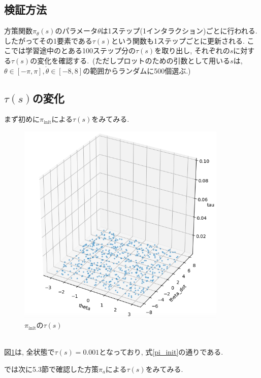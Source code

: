 \documentclass{jsarticle}
\begin{document}
\subsection{検証方法}
方策関数$\pi_{\theta}(s)$のパラメータ$\theta$は1ステップ(1インタラクション)ごとに行われる. したがってその1要素である$\tau(s)$という関数も1ステップごとに更新される. ここでは学習途中のとある100ステップ分の$\tau(s)$を取り出し, それぞれの$s$に対する$\tau(s)$の変化を確認する.~(ただしプロットのための引数として用いる$s$は,~$\theta\in [-\pi, \pi], \dot{\theta}\in [-8,8]$の範囲からランダムに500個選ぶ.) 


\subsection{$\tau(s)$の変化}
まず初めに$\pi_{\textrm{init}}$による$\tau(s)$をみてみる.
\begin{figure}[h]
	\centering
 	\includegraphics[width=10cm]{tau_dependency_of_initial_policy.png}
 	\caption{$\pi_{\textrm{init}}$の$\tau(s)$} \label{initial_tau}
\end{figure}\\
図\ref{initial_tau}は, 全状態で$\tau(s)=0.001$となっており, 式\eqref{pi_init}の通りである.\par
\newpage
では次に5.3節で確認した方策$\pi_a$による$\tau(s)$をみてみる.
\end{document}
